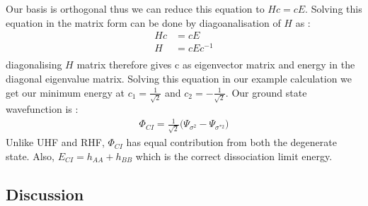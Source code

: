 \documentclass[11pt]{article}   	%
\begin{document}
	Our basis is orthogonal thus we can reduce this equation to $Hc=cE$. Solving this equation in the 
	matrix form can be done by diagoanalisation of $H$ as :
	\begin{equation}
	\begin{split}
		Hc&=cE\\
		H&=cEc^{-1}\\
	\end{split}
	\end{equation}
	diagonalising $H$ matrix therefore gives c as eigenvector matrix and energy in the diagonal 
	eigenvalue matrix. Solving this equation in our example calculation
	 we get our minimum energy at $c_1=\frac{1}{\sqrt{2}}$ and $c_2=-\frac{1}{\sqrt{2}}$. Our
	 ground state wavefunction is :\\
	\begin{equation}
	\begin{split}
		\Phi_{CI}=\frac{1}{\sqrt{2}}\big(\Psi_{\sigma^2}-\Psi_{\sigma^{*2}}\big)
	\end{split}
	\end{equation}
	Unlike UHF and RHF, $\Phi_{CI}$ has equal contribution from both the degenerate state. 
	Also, $E_{CI}=h_{AA}+h_{BB}$ which is the correct dissociation limit energy.\\ 
	\subsection{Discussion}	
\end{document}
